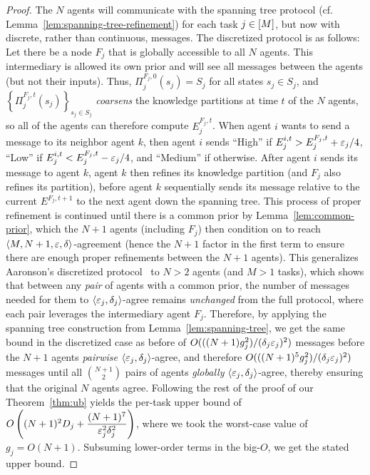 \begin{proof}
The $N$ agents will communicate with the spanning tree protocol (cf. Lemma~\ref{lem:spanning-tree-refinement}) for each task $j \in [M]$, but now with discrete, rather than continuous, messages.
The discretized protocol is as follows:
Let there be a node $F_j$ that is globally accessible to all $N$ agents.
This intermediary is allowed its own prior and will see all messages between the agents (but not their inputs).
Thus, $\Pi_j^{F_j,0}(s_j) = S_j$ for all states $s_j \in S_j$, and $\left\{\Pi^{F_j,t}_j(s_j)\right\}_{s_j \in S_j}$ \emph{coarsens} the knowledge partitions at time $t$ of the $N$ agents, so all of the agents can therefore compute $E^{F_j,t}_j$.
When agent $i$ wants to send a message to its neighbor agent $k$, then agent $i$ sends ``High'' if $E^{i,t}_j > E^{F_j,t}_j + \varepsilon_j/4$, ``Low'' if $E^{i,t}_j < E^{F_j,t}_j - \varepsilon_j/4$, and ``Medium'' if otherwise.
After agent $i$ sends its message to agent $k$, agent $k$ then refines its knowledge partition (and $F_j$ also refines its partition), before agent $k$ sequentially sends its message relative to the current $E^{F_j,t+1}$ to the next agent down the spanning tree.
This process of proper refinement is continued until there is a common prior by Lemma~\ref{lem:common-prior}, which the $N+1$ agents (including $F_j$) then condition on to reach $\left \langle M, N+1, \varepsilon, \delta \right \rangle $-agreement (hence the $N+1$ factor in the first term to ensure there are enough proper refinements between the $N+1$ agents).
This generalizes Aaronson's discretized protocol~\citep[Theorem 6]{aaronson2005complexity} to $N > 2$ agents (and $M > 1$ tasks), which shows that between any \emph{pair} of agents with a common prior, the number of messages needed for them to $\left \langle \varepsilon_j, \delta_j \right \rangle $-agree remains \emph{unchanged} from the full protocol, where each pair leverages the intermediary agent $F_j$.
Therefore, by applying the spanning tree construction from Lemma~\ref{lem:spanning-tree}, we get the same bound in the discretized case as before of $O(((N+1)g_j^2)/(\delta_j\varepsilon_j)^2)$ messages before the $N+1$ agents \emph{pairwise} $\left \langle \varepsilon_j,\delta_j \right \rangle $-agree, and therefore $O(((N+1)^5g_j^2)/(\delta_j\varepsilon_j)^2)$ messages until all $\binom{N+1}{2}$ pairs of agents \emph{globally} $\left \langle \varepsilon_j,\delta_j \right \rangle $-agree, thereby ensuring that the original $N$ agents agree.
Following the rest of the proof of our Theorem~\ref{thm:ub} yields the per-task upper bound of $O\left((N+1)^2D_j + \dfrac{(N+1)^7}{\varepsilon_j^2\delta_j^2}\right)$, where we took the worst-case value of $g_j = O(N + 1)$.
Subsuming lower-order terms in the big-$O$, we get the stated upper bound.
\end{proof}

